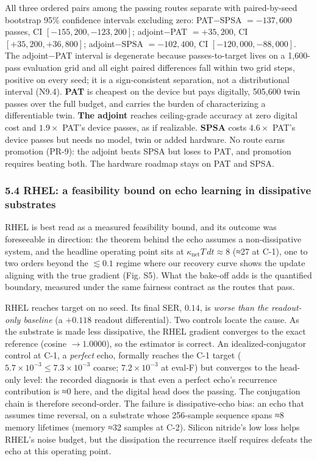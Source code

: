 \documentclass[
  10pt,
]{article}
\begin{document}
All three ordered pairs among the passing routes separate with
paired-by-seed bootstrap 95\% confidence intervals excluding zero:
PAT−SPSA \(=-137{,}600\) passes, CI \([-155{,}200,-123{,}200]\);
adjoint−PAT \(=+35{,}200\), CI \([+35{,}200,+36{,}800]\); adjoint−SPSA
\(=-102{,}400\), CI \([-120{,}000,-88{,}000]\). The adjoint−PAT interval
is degenerate because passes-to-target lives on a 1,600-pass evaluation
grid and all eight paired differences fall within two grid steps,
positive on every seed; it is a sign-consistent separation, not a
distributional interval (N9.4). \textbf{PAT} is cheapest on the device
but pays digitally, 505,600 twin passes over the full budget, and
carries the burden of characterizing a differentiable twin. \textbf{The
adjoint} reaches ceiling-grade accuracy at zero digital cost and
\(1.9\times\) PAT's device passes, as if realizable. \textbf{SPSA} costs
\(4.6\times\) PAT's device passes but needs no model, twin or added
hardware. No route earns promotion (PR-9): the adjoint beats SPSA but
loses to PAT, and promotion requires beating both. The hardware roadmap
stays on PAT and SPSA.

\subsubsection{5.4 RHEL: a feasibility bound on echo learning in
dissipative
substrates}\label{rhel-a-feasibility-bound-on-echo-learning-in-dissipative-substrates}

RHEL is best read as a measured feasibility bound, and its outcome was
foreseeable in direction: the theorem behind the echo assumes a
non-dissipative system, and the headline operating point sits at
\(\kappa_\text{net} T\, dt \approx 8\) (≈27 at C-1), one to two orders
beyond the \(\lesssim 0.1\) regime where our recovery curve shows the
update aligning with the true gradient (Fig. S5). What the bake-off adds
is the quantified boundary, measured under the same fairness contract as
the routes that pass.

RHEL reaches target on no seed. Its final SER, \(0.14\), is \emph{worse
than the readout-only baseline} (a \(+0.118\) readout differential). Two
controls locate the cause. As the substrate is made less dissipative,
the RHEL gradient converges to the exact reference (cosine
\(\to 1.0000\)), so the estimator is correct. An idealized-conjugator
control at C-1, a \emph{perfect} echo, formally reaches the C-1 target
(\(5.7\times10^{-3} \le 7.3\times10^{-3}\) coarse; \(7.2\times10^{-3}\)
at eval-F) but converges to the head-only level: the recorded diagnosis
is that even a perfect echo's recurrence contribution is ≈0 here, and
the digital head does the passing. The conjugation chain is therefore
second-order. The failure is dissipative-echo bias: an echo that assumes
time reversal, on a substrate whose 256-sample sequence spans ≈8 memory
lifetimes (memory ≈32 samples at C-2). Silicon nitride's low loss helps
RHEL's noise budget, but the dissipation the recurrence itself requires
defeats the echo at this operating point.
\end{document}
